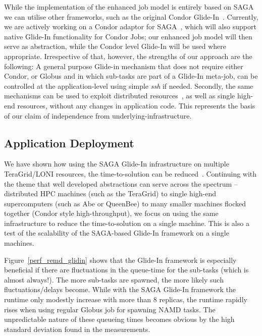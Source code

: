 \documentclass{llncs}
\begin{document}
While the implementation of the enhanced job model is entirely based
on SAGA %
we can utilise other frameworks, such as the original Condor
Glide-In~\cite{citeulike:291860}. %
Currently, we are actively working on a Condor adaptor for
SAGA~\cite{saga_condor_url}, which will also support native Glide-In
functionality for Condor Jobs; our enhanced job model will then serve
as abstraction, while the Condor level Glide-In will be used where
appropriate.  Irrespective of that, however, the strengths of our
approach are the following: A general purpose Glide-in mechanism that
does not require either Condor, or Globus and in which sub-tasks are
part of a Glide-In meta-job, can be controlled at the
application-level using simple {\it ssh} if needed. Secondly, the same
mechanisms can be used to exploit distributed
resources~\cite{repex_ptrsa}, as well as single high-end resources,
without any changes in application code.  This represents the basis of
our claim of independence from underlying-infrastructure.

\up

\subsection{Application Deployment}

\up


We have shown how using the SAGA Glide-In infrastructure on multiple
TeraGrid/LONI resources, the time-to-solution can be
reduced~\cite{Luckow:2008la}. Continuing with the theme that well
developed abstractions can serve across the spectrum -- distributed
HPC machines (such as the TeraGrid) to single high-end supercomputers
(such as Abe or QueenBee) to many smaller machines flocked together
(Condor style high-throughput), we focus on using the same
infrastructure to reduce the time-to-solution on a single machine.
This is also a test of the scalability of the SAGA-based Glide-In
framework on a single machines. %

Figure~\ref{perf_remd_glidin} shows that the Glide-In framework is
especially beneficial if there are fluctuations in the queue-time for
the sub-tasks (which is almost always!). The more sub-tasks are
spawned, the more likely such fluctuations/delays become. While with
the SAGA Glide-In framework the runtime only modestly increase with
more than 8 replicas, the runtime rapidly rises when using regular
Globus job for spawning NAMD tasks. The unpredictable nature of these
queueing times becomes obvious by the high standard deviation found in
the measurements.
\end{document}
